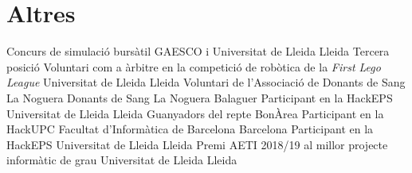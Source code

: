 \documentclass[a4paper,12pt,final]{moderncv}
\begin{document}
\section{Altres}
	{Concurs de simulació bursàtil}
	{GAESCO i Universitat de Lleida}
	{Lleida}
	{Tercera posició}
	{}
	{Voluntari com a àrbitre en la competició de robòtica de la
		\textit{First Lego League}}
	{Universitat de Lleida}
	{Lleida}
	{}
	{}
	{Voluntari de l'Associació de Donants de Sang La Noguera}
	{Donants de Sang La Noguera}
	{Balaguer}
	{}
	{}
	{Participant en la HackEPS}
	{Universitat de Lleida}
	{Lleida}
	{Guanyadors del repte BonÀrea}
	{} %
	{Participant en la HackUPC}
	{Facultat d'Informàtica de Barcelona}
	{Barcelona}
	{}
	{} %
	{Participant en la HackEPS}
	{Universitat de Lleida}
	{Lleida}
	{}
	{} %
	{Premi AETI 2018/19 al millor projecte informàtic de grau}
	{Universitat de Lleida}
	{Lleida}
	{}
	{} %
\end{document}

